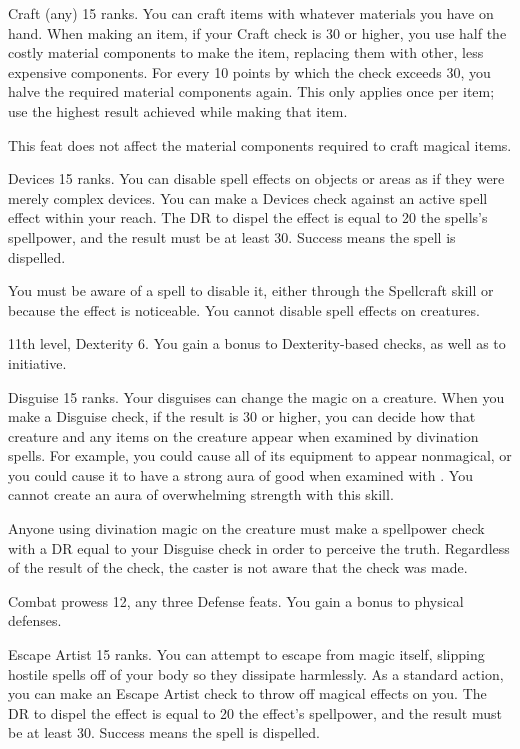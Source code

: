 \featpre Craft (any) 15 ranks.
\featben You can craft items with whatever materials you have on hand.
When making an item, if your Craft check is 30 or higher, you use half the costly material components to make the item, replacing them with other, less expensive components.
For every 10 points by which the check exceeds 30, you halve the required material components again.
This only applies once per item; use the highest result achieved while making that item.

This feat does not affect the material components required to craft magical items.

\featpre Devices 15 ranks.
\featben You can disable spell effects on objects or areas as if they were merely complex devices.
You can make a Devices check against an active spell effect within your reach.
The DR to dispel the effect is equal to 20 \add the spells's spellpower, and the result must be at least 30.
Success means the spell is dispelled.

You must be aware of a spell to disable it, either through the Spellcraft skill or because the effect is noticeable.
You cannot disable spell effects on creatures.

\featpres 11th level, Dexterity 6.
\featben You gain a  bonus to Dexterity-based checks, as well as to initiative.

\featpre Disguise 15 ranks.
\featben Your disguises can change the magic on a creature.
When you make a Disguise check, if the result is 30 or higher, you can decide how that creature and any items on the creature appear when examined by divination spells.
For example, you could cause all of its equipment to appear nonmagical, or you could cause it to have a strong aura of good when examined with .
You cannot create an aura of overwhelming strength with this skill.

Anyone using divination magic on the creature must make a spellpower check with a DR equal to your Disguise check in order to perceive the truth.
Regardless of the result of the check, the caster is not aware that the check was made.

\featpres Combat prowess 12, any three Defense feats.
\featben You gain a  bonus to physical defenses.

\featpre Escape Artist 15 ranks.
\featben You can attempt to escape from magic itself, slipping hostile spells off of your body so they dissipate harmlessly.
As a standard action, you can make an Escape Artist check to throw off magical effects on you.
The DR to dispel the effect is equal to 20 \add the effect's spellpower, and the result must be at least 30.
Success means the spell is dispelled.

